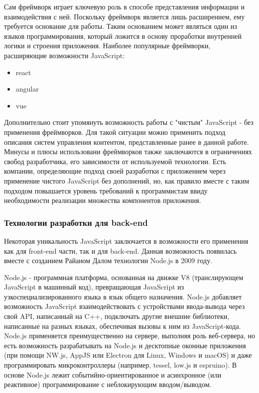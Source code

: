         Сам фреймворк играет ключевую роль в способе представления информации и взаимодействия с ней.
        Поскольку фреймворк является лишь расширением, ему требуется основание для работы.
        Таким основанием может являться один из языков программирования, который ложится в основу проработки внутренней логики и строения приложения.
        Наиболее популярные фреймворки, расширяющие возможности JavaScript:
        \begin{itemize}
            \item react
            \item angular
            \item vue
        \end{itemize}
        Дополнительно стоит упомянуть возможность работы с "чистым" JavaScript - без применения фреймворков.
        Для такой ситуации можно применить подход описания систем управления контентом, представленные ранее в данной работе.
        Минусы и плюсы использовани фреймворков также заключаются в ограничениях свобод разработчика, его зависимости от используемой технологии.
        Есть компании, определяющие подход своей разработки с приложением через применение чистого JavaScript без дополнений, но, как правило вместе с таким подходом повышается уровень требований к программистам ввиду необходимости реализации множества компонентов приложения.

    \subsubsection{Технологии разработки для back-end}
        Некоторая уникальность JavaScript заключается в возможности его применения как для front-end части, так и для back-end.
        Данная возможность появилась вместе с созданием Райаном Далом технологии Node.js в 2009 году.

        Node.js - программная платформа, основанная на движке V8 (транслирующем JavaScript в машинный код), превращающая JavaScript из узкоспециализированного языка в язык общего назначения.
        Node.js добавляет возможность JavaScript взаимодействовать с устройствами ввода-вывода через свой API, написанный на C++, подключать другие внешние библиотеки, написанные на разных языках, обеспечивая вызовы к ним из JavaScript-кода.
        Node.js применяется преимущественно на сервере, выполняя роль веб-сервера, но есть возможность разрабатывать на Node.js и десктопные оконные приложения (при помощи NW.js, AppJS или Electron для Linux, Windows и macOS) и даже программировать микроконтроллеры (например, tessel, low.js и espruino).
        В основе Node.js лежит событийно-ориентированное и асинхронное (или реактивное) программирование с неблокирующим вводом/выводом. %
        
